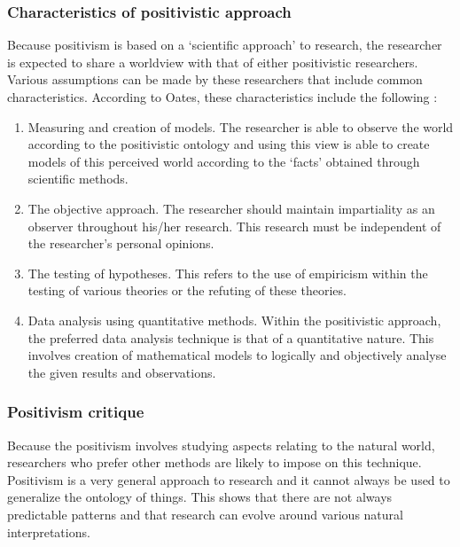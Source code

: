 \subsubsection{Characteristics of positivistic approach}
Because positivism is based on a ‘scientific approach’ to research, the researcher is expected to share a worldview with that of either positivistic researchers. Various assumptions can be made by these researchers that include common characteristics. According to Oates, these characteristics include the following \cite{OatesJ2006}: 
\begin{enumerate}[label=\roman*.]
	\item Measuring and creation of models. The researcher is able to observe the world according to the positivistic ontology and using this view is able to create models of this perceived world according to the ‘facts’ obtained through scientific methods.
	\item The objective approach. The researcher should maintain impartiality as an observer throughout his/her research. This research must be independent of the researcher’s personal opinions.
	\item The testing of hypotheses. This refers to the use of empiricism within the testing of various theories or the refuting of these theories.
	\item Data analysis using quantitative methods. Within the positivistic approach, the preferred data analysis technique is that of a quantitative nature. This involves creation of mathematical models to logically and objectively analyse the given results and observations.
\end{enumerate}

\subsubsection{Positivism critique}
Because the positivism involves studying aspects relating to the natural world, researchers who prefer other methods are likely to impose on this technique. Positivism is a very general approach to research and it cannot always be used to generalize the ontology of things. This shows that there are not always predictable patterns and that research can evolve around various natural interpretations.
